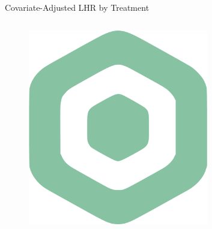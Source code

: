 \documentclass[compress,ignorenonframetext,aspectratio=1610]{beamer}
\begin{document}
\begin{frame}{Covariate-Adjusted LHR by Treatment}
\begin{columns}
		\begin{figure}
			\includegraphics[width=0.7\textwidth]{figs/logos/logo-vectorizado-crop.pdf}	
		\end{figure}

	\end{columns}
\end{frame}
\end{document}
